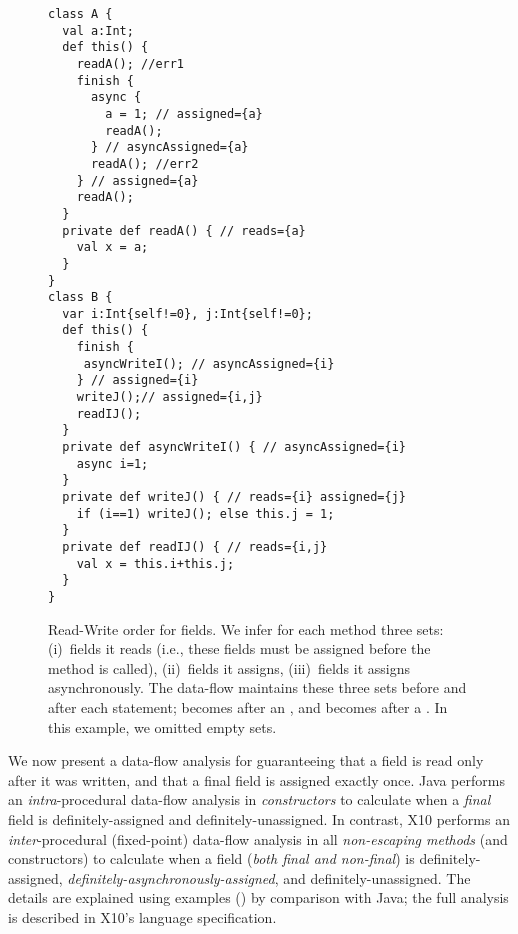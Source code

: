 \begin{figure}
\vspace{-0.2cm}\begin{lstlisting}
class A {
  val a:Int;
  def this() {
    readA(); //err1
    finish {
      async {
        a = 1; // assigned={a}
        readA();
      } // asyncAssigned={a}
      readA(); //err2
    } // assigned={a}
    readA();
  }
  private def readA() { // reads={a}
    val x = a;
  }
}
class B {
  var i:Int{self!=0}, j:Int{self!=0};
  def this() {
    finish {
     asyncWriteI(); // asyncAssigned={i}
    } // assigned={i}
    writeJ();// assigned={i,j}
    readIJ();
  }
  private def asyncWriteI() { // asyncAssigned={i}
    async i=1;
  }
  private def writeJ() { // reads={i} assigned={j}
    if (i==1) writeJ(); else this.j = 1;
  }
  private def readIJ() { // reads={i,j}
    val x = this.i+this.j;
  }
}
\end{lstlisting}\vspace{-0.2cm}
\caption{Read-Write order for fields.
    We infer for each method three sets:
        (i)~fields it reads (i.e., these fields must be assigned before the method is called),
        (ii)~fields it assigns,
        (iii)~fields it assigns asynchronously.
    The data-flow maintains these three sets before and after each statement;
         becomes  after an ,
        and  becomes  after a .
    In this example, we omitted empty sets.
    }
\label{Figure:Read-Write-Order}
\end{figure}

We now present a data-flow analysis for guaranteeing
    that a field is read only after it was written,
    and that a final field is assigned exactly once.
Java performs an \emph{intra}-procedural data-flow analysis in \emph{constructors} to calculate
    when a \emph{final} field is definitely-assigned and definitely-unassigned.
In contrast, X10 performs an \emph{inter}-procedural (fixed-point) data-flow analysis
    in all \emph{non-escaping methods} (and constructors) to calculate
    when {a} field (\emph{both final and non-final}) is
    definitely-assigned, \emph{definitely-asynchronously-assigned}, and definitely-unassigned.
The details are explained using examples () by comparison with Java;
    the full analysis is described in X10's language specification.

